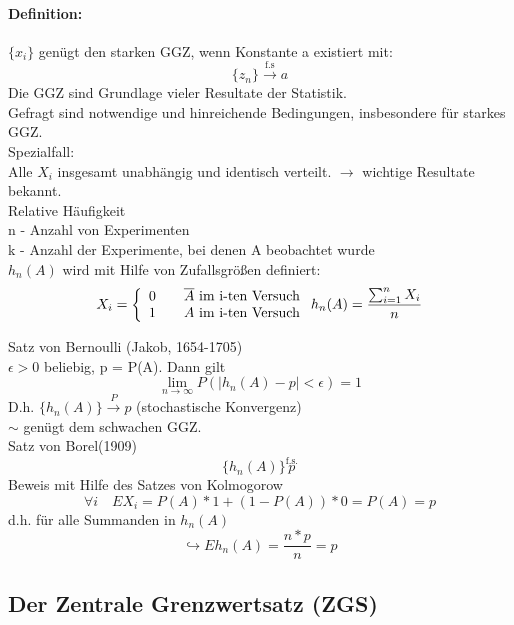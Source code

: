 \documentclass[a4paper,12pt]{scrartcl}
\begin{document}
  \paragraph{Definition:} $\{x_i\}$ genügt den starken GGZ, wenn Konstante a existiert mit:
  $$\{z_n\}\overset{\text{f.s}}{\rightarrow}a$$
  Die GGZ sind Grundlage vieler Resultate der Statistik.\\
  Gefragt sind notwendige und hinreichende Bedingungen, insbesondere für starkes GGZ.\\
  Spezialfall:\\
  Alle $X_i$ insgesamt unabhängig und identisch verteilt. $\rightarrow$ wichtige Resultate bekannt.\\
  Relative Häufigkeit\\
  n - Anzahl von Experimenten\\
  k - Anzahl der Experimente, bei denen A beobachtet wurde\\
  $h_n(A)$ wird mit Hilfe von Zufallsgrößen definiert:
  $$X_i =  \left\{ \begin{array}{l l}
    0 & \quad \overline{A}\text{ im i-ten Versuch}\\
    1 & \quad A \text{ im i-ten Versuch}
  \end{array} \right. h_n(A) = \frac{\sum^n_{i=1}X_i}{n}$$
 
 Satz von Bernoulli (Jakob, 1654-1705)\\
 $\epsilon>0$ beliebig, p = P(A). Dann gilt
 $$\lim_{n\rightarrow\infty} P(|h_n(A)-p|<\epsilon)=1$$
 D.h. $\{h_n(A)\}\overset{P}{\rightarrow}p$ (stochastische Konvergenz)\\
 $\sim$ genügt dem schwachen GGZ.\\
 Satz von Borel(1909)
 $$\{h_n(A)\}\overset{\text{f.s.}}{p}$$
 Beweis mit Hilfe des Satzes von Kolmogorow
 $$\forall i\quad EX_i = P(A)*1 + (1-P(A))*0 = P(A) = p$$
 d.h. für alle Summanden in $h_n(A)$
 $$\hookrightarrow Eh_n(A) = \frac{n*p}{n} = p$$
 
 \subsection{Der Zentrale Grenzwertsatz (ZGS)}
\end{document}
